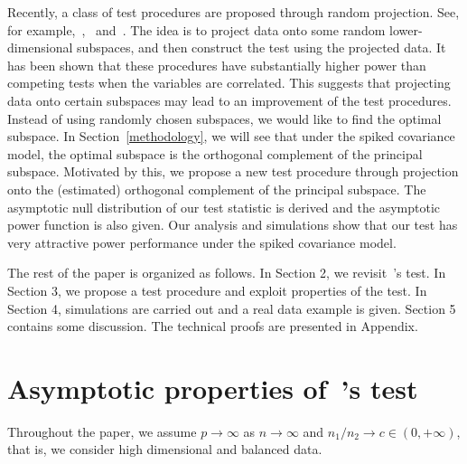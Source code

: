\documentclass[3p]{elsarticle}
\theoremstyle{plain}
\theoremstyle{definition}
\theoremstyle{remark}
\begin{document}
Recently, a class of test procedures are proposed through random projection.
See, for example,~\cite{Lopes2015A},~\cite{Thulin2014A} and~\cite{Srivastava2014RAPTT}.
The idea is to project data onto some random lower-dimensional subspaces, and then construct the test using the projected data.
It has been shown that these procedures have substantially higher power than competing tests when the variables are correlated. 
This suggests that projecting data onto certain subspaces may lead to an improvement of the test procedures.
Instead of using randomly chosen subspaces, we would like to find the optimal subspace.
In Section~\ref{methodology}, we will see that under the spiked covariance model, the optimal subspace is the orthogonal complement of the principal subspace.
Motivated by this, we propose a new test procedure through projection onto the (estimated) orthogonal complement of the principal subspace.  
The asymptotic null distribution of our test statistic is derived and the asymptotic power function is also given.
Our analysis and simulations show that our test has very attractive power performance under the spiked covariance model.




The rest of the paper is organized as follows. In Section 2,  we revisit~\cite{Chen2010A}'s test.  In Section 3, we propose a test procedure and exploit properties of the test.  In Section 4, simulations are carried out and  a real data example is given. Section 5 contains some discussion. The technical proofs are presented in Appendix.

\section{Asymptotic properties of~\cite{Chen2010A}'s test}\label{sec:chen}
    Throughout the paper, we  assume $p\to \infty$ as $n\to \infty$ and ${n_1}/{n_2}\to c \in (0,+\infty)$, that is, we consider high dimensional and balanced data.
\end{document}
